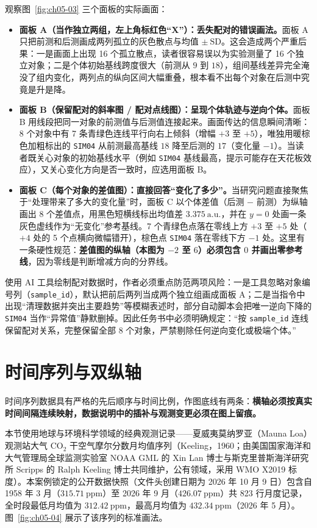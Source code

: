 观察图~\ref{fig:ch05-03} 三个面板的实际画面：
\begin{itemize}
\item \textbf{面板 A（当作独立两组，左上角标红色“X”）：丢失配对的错误画法。}面板 A 只把前测和后测画成两列孤立的灰色散点与均值 $\pm\ \text{SD}$。这会造成两个严重后果：一是画面上出现 16 个孤立散点，读者很容易误以为实验测量了 16 个独立对象；二是个体初始基线跨度很大（前测从 $9$ 到 $18$），组间基线差异完全淹没了组内变化，两列点的纵向区间大幅重叠，根本看不出每个对象在后测中究竟是升是降。
\item \textbf{面板 B（保留配对的斜率图 / 配对点线图）：呈现个体轨迹与逆向个体。}面板 B 用线段把同一对象的前测值与后测值连接起来。画面传达的信息瞬间清晰：8 个对象中有 7 条青绿色连线平行向右上倾斜（增幅 $+3$ 至 $+5$），唯独用暖棕色加粗标出的 \texttt{SIM04} 从前测最高基线 $18$ 降至后测的 $17$（变化量 $-1$）。当读者既关心对象的初始基线水平（例如 \texttt{SIM04} 基线最高，提示可能存在天花板效应），又关心变化方向是否一致时，应选用面板 B。
\item \textbf{面板 C（每个对象的差值图）：直接回答“变化了多少”。}当研究问题直接聚焦于“处理带来了多大的变化量”时，面板 C 以个体差值（后测 $-$ 前测）为纵轴画出 8 个差值点，用黑色短横线标出均值差 $3.375\ \text{a.u.}$，并在 $y = 0$ 处画一条灰色虚线作为“无变化”参考基线。7 个青绿色点落在零线上方 $+3$ 至 $+5$ 处（$+4$ 处的 5 个点横向微幅错开），棕色点 \texttt{SIM04} 落在零线下方 $-1$ 处。这里有一条硬性规范：\textbf{差值图的纵轴（本图为 $-2$ 至 $6$）必须包含 $0$ 并画出零参考线}，因为零线是判断增减方向的分界线。
\end{itemize}

使用 AI 工具绘制配对数据时，作者必须重点防范两项风险：一是工具忽略对象编号列（\texttt{sample\_id}），默认把前后两列当成两个独立组画成面板 A；二是当指令中出现“清理数据并突出主要趋势”等模糊表述时，部分自动脚本会把唯一逆向下降的 \texttt{SIM04} 当作“异常值”静默删掉。因此任务书中必须明确规定：“按 \texttt{sample\_id} 连线保留配对关系，完整保留全部 8 个对象，严禁剔除任何逆向变化或极端个体。”

\section{时间序列与双纵轴}

时间序列数据具有严格的先后顺序与时间比例，作图底线有两条：\textbf{横轴必须按真实时间间隔连续映射，数据说明中的插补与观测变更必须在图上留痕。}

本节使用地球与环境科学领域的经典观测记录——夏威夷莫纳罗亚（Mauna Loa）观测站大气 $\text{CO}_2$ 干空气摩尔分数月均值序列（Keeling，1960；由美国国家海洋和大气管理局全球监测实验室 NOAA GML 的 Xin Lan 博士与斯克里普斯海洋研究所 Scripps 的 Ralph Keeling 博士共同维护，公有领域，采用 WMO X2019 标度）。本案例锁定的公开数据快照（文件头创建日期为 2026 年 10 月 9 日）包含自 1958 年 3 月（$315.71\ \text{ppm}$）至 2026 年 9 月（$426.07\ \text{ppm}$）共 823 行月度记录，全时段最低月均值为 $312.42\ \text{ppm}$，最高月均值为 $432.34\ \text{ppm}$（2026 年 5 月）。图~\ref{fig:ch05-04} 展示了该序列的标准画法。

